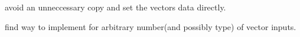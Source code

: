 
\begin{DoxyRefList}
\item[\label{todo__todo000001}%
\hypertarget{todo__todo000001}{}%
Class \hyperlink{classfilval_1_1WrapperVector}{filval\+:\+:Wrapper\+Vector$<$ T $>$} ]avoid an unneccessary copy and set the vectors data directly.  
\item[\label{todo__todo000002}%
\hypertarget{todo__todo000002}{}%
Class \hyperlink{classfilval_1_1ZipMapFour}{filval\+:\+:Zip\+Map\+Four$<$ R, T $>$} ]find way to implement for arbitrary number(and possibly type) of vector inputs. 
\end{DoxyRefList}